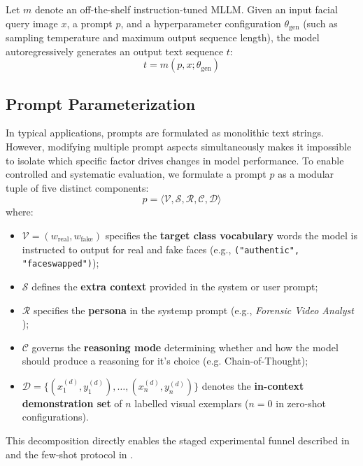 Let $m$ denote an off-the-shelf instruction-tuned MLLM. Given an input facial query image $x$, a prompt $p$, and a hyperparameter configuration $\theta_{\text{gen}}$ (such as sampling temperature and maximum output sequence length), the model autoregressively generates an output text sequence $t$:
\begin{equation}
    t = m(p, x; \theta_{\text{gen}})
\end{equation}

\subsection{Prompt Parameterization}

In typical applications, prompts are formulated as monolithic text strings. However, modifying multiple prompt aspects simultaneously makes it impossible to isolate which specific factor drives changes in model performance. To enable controlled and systematic evaluation, we formulate a prompt $p$ as a modular tuple of five distinct components:
\begin{equation}
    p = \langle \mathcal{V}, \mathcal{S}, \mathcal{R}, \mathcal{C}, \mathcal{D} \rangle
\end{equation}
where:
\begin{itemize}
    \item $\mathcal{V} = (w_{\text{real}}, w_{\text{fake}})$ specifies the \textbf{target class vocabulary} words the model is instructed to output for real and fake faces (e.g., \texttt{("authentic", "faceswapped")});
    \item $\mathcal{S}$ defines the \textbf{extra context} provided in the system or user prompt;
    \item $\mathcal{R}$ specifies the \textbf{persona} in the systemp prompt (e.g., \emph{Forensic Video Analyst} );
    \item $\mathcal{C}$ governs the \textbf{reasoning mode} determining whether and how the model should produce a reasoning for it's choice (e.g. Chain-of-Thought);
    \item $\mathcal{D} = \{(x_1^{(d)}, y_1^{(d)}), \dots, (x_n^{(d)}, y_n^{(d)})\}$ denotes the \textbf{in-context demonstration set} of $n$ labelled visual exemplars ($n = 0$ in zero-shot configurations).
\end{itemize}

This decomposition directly enables the staged experimental funnel described in  and the few-shot protocol in .

